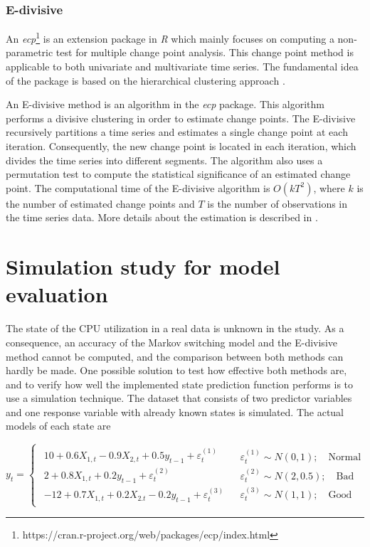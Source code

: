 \subsubsection*{E-divisive}

An \emph{ecp}\footnote{https://cran.r-project.org/web/packages/ecp/index.html}
is an extension package in \emph{R} which mainly focuses on computing
a non-parametric test for multiple change point analysis. This change
point method is applicable to both univariate and multivariate time
series. The fundamental idea of the package is based on the hierarchical
clustering approach \citep{james2013ecp}. 

An E-divisive method is an algorithm in the \emph{ecp} package. This
algorithm performs a divisive clustering in order to estimate change
points. The E-divisive recursively partitions a time series and estimates
a single change point at each iteration. Consequently, the new change
point is located in each iteration, which divides the time series
into different segments. The algorithm also uses a permutation test
to compute the statistical significance of an estimated change point.
The computational time of the E-divisive algorithm is $O(kT^{2})$,
where $k$ is the number of estimated change points and $T$ is the
number of observations in the time series data. More details about
the estimation is described in \citet{matteson2014nonparametric}.


\section{Simulation study for model evaluation \label{sec:Simulation}}

The state of the CPU utilization in a real data is unknown in the
study. As a consequence, an accuracy of the Markov switching model
and the E-divisive method cannot be computed, and the comparison between
both methods can hardly be made. One possible solution to test how
effective both methods are, and to verify how well the implemented
state prediction function performs is to use a simulation technique.
The dataset that consists of two predictor variables and one response
variable with already known states is simulated. The actual models
of each state are 

\[
y_{t}=\begin{cases}
\begin{array}{c}
10+0.6X_{1,t}-0.9X{}_{2,t}+0.5y_{t-1}+\varepsilon_{t}^{(1)}\\
2+0.8X_{1,t}+0.2y_{t-1}+\varepsilon_{t}^{(2)}\\
-12+0.7X_{1,t}+0.2X{}_{2.t}-0.2y_{t-1}+\varepsilon_{t}^{(3)}
\end{array} & \begin{array}{c}
\varepsilon_{t}^{(1)}\sim N(0,1);\quad\mathrm{Normal}\\
\varepsilon_{t}^{(2)}\sim N(2,0.5);\quad\mathrm{Bad}\\
\varepsilon_{t}^{(3)}\sim N(1,1);\quad\mathrm{Good}
\end{array}\end{cases}
\]

